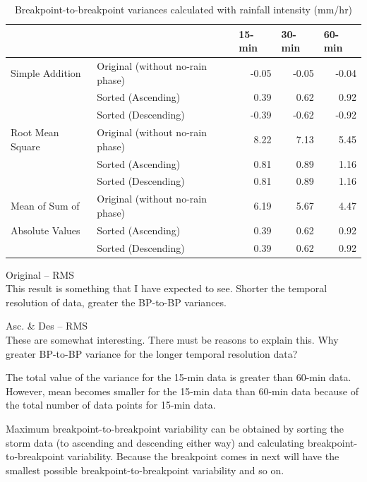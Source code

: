 \begin{table}[htbp]
  \centering
  \caption{Breakpoint-to-breakpoint variances calculated with rainfall intensity
(mm/hr)}
  \label{b2b_intensity}
    \begin{tabular}{llrrr}
      \toprule
       &  & \multicolumn{1}{l}{15-min} & \multicolumn{1}{l}{30-min} &
\multicolumn{1}{l}{60-min} \\
      \midrule
      Simple Addition & Original (without no-rain phase)& -0.05 & -0.05 & -0.04
\\
       & Sorted (Ascending) & 0.39 & 0.62 & 0.92 \\
       & Sorted (Descending) & -0.39 & -0.62 & -0.92 \\
      \midrule
      Root Mean Square & Original (without no-rain phase)& 8.22 & 7.13 & 5.45 \\
       & Sorted (Ascending) & 0.81 & 0.89 & 1.16 \\
       & Sorted (Descending) & 0.81 & 0.89 & 1.16 \\
      \midrule
      Mean of Sum of & Original (without no-rain phase) & 6.19 & 5.67 & 4.47 \\
      Absolute Values & Sorted (Ascending)& 0.39 & 0.62 & 0.92 \\
       & Sorted (Descending)& 0.39 & 0.62 & 0.92 \\
      \bottomrule
    \end{tabular}
\end{table}

Original -- RMS\\
This result is something that I have expected to see. Shorter the temporal
resolution of data,  greater the BP-to-BP variances.

Asc. \& Des -- RMS\\
These are somewhat interesting. There must be reasons to explain this. Why
greater BP-to-BP variance for the longer temporal resolution data?

The total value of the variance for the 15-min data is greater than 60-min data.
However, mean becomes smaller for the 15-min data than 60-min data because of
the total number of data points for 15-min data.

Maximum breakpoint-to-breakpoint variability can be obtained by sorting the
storm data (to ascending and descending either way) and calculating
breakpoint-to-breakpoint variability. Because the breakpoint comes in next will
have the smallest possible breakpoint-to-breakpoint variability and so on.

